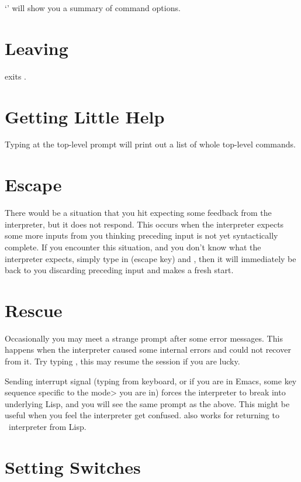 `' will show you a summary of command options. 

\section{Leaving \hcafeobj}

 exits \cafeobj.

\section{Getting Little Help}

Typing  at the top-level prompt will print out a list of whole
top-level commands.

\section{Escape}

There would be a situation that you hit  expecting some feedback from the interpreter, but it does not respond. 
This occurs when the interpreter expects some more inputs from you thinking
preceding input is not yet syntactically complete. If you encounter this situation, 
and you don't know what the interpreter expects, 
simply type in (escape key) and , then it will
immediately be back to you discarding preceding input
and makes a fresh start.


\section{Rescue}

Occasionally you may meet a strange prompt  after some
error messages. This happens when the interpreter caused some internal
errors and could not recover from it. Try typing , this may
resume the session if you are lucky. 

Sending interrupt signal (typing  from keyboard, or if you
are in Emacs, some key sequence specific to the \<mode> you are in)
forces the interpreter to break into underlying Lisp, and you will see
the same prompt as the above. 
This might be useful when you feel the interpreter get confused.
 also works for returning to \cafeobj\ interpreter from Lisp.

\section{Setting Switches}

